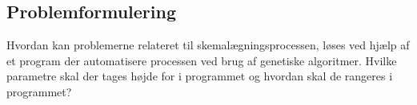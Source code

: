 \subsection{Problemformulering}
Hvordan kan problemerne relateret til skemalægningsprocessen, løses ved hjælp af et program der automatisere processen ved brug af genetiske algoritmer. Hvilke parametre skal der tages højde for i programmet og hvordan skal de rangeres i programmet?